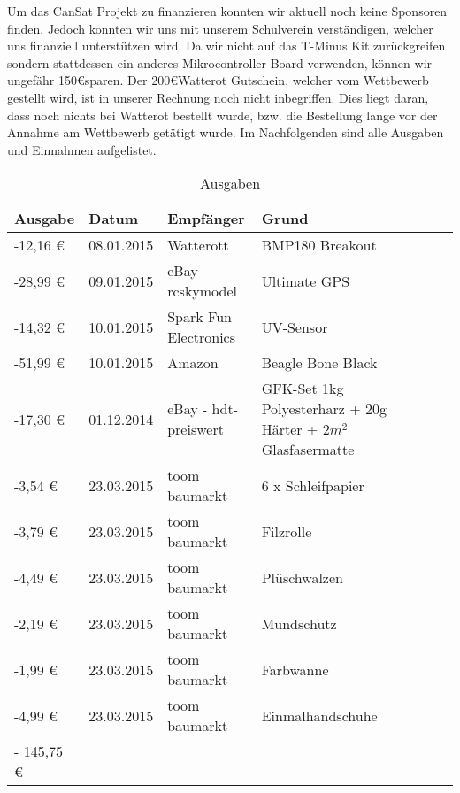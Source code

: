 Um das CanSat Projekt zu finanzieren konnten wir aktuell noch keine Sponsoren finden. Jedoch konnten wir uns mit unserem Schulverein verständigen, welcher uns finanziell unterstützen wird. Da wir nicht auf das T-Minus Kit zurückgreifen sondern stattdessen ein anderes Mikrocontroller Board verwenden, können wir ungefähr 150\euro  sparen. Der 200\euro  Watterot Gutschein, welcher vom Wettbewerb gestellt wird, ist in unserer Rechnung noch nicht inbegriffen. Dies liegt daran, dass noch nichts bei Watterot bestellt wurde, bzw. die Bestellung lange vor der Annahme am Wettbewerb getätigt wurde.
Im Nachfolgenden sind alle Ausgaben und Einnahmen aufgelistet.
\begin{table}[htbp]
  \centering
    \begin{tabular}{p{}p{}p{}p{}rrrl}
    \toprule
    \textbf{Ausgabe} & \textbf{Datum} & \textbf{Empfänger} & \textbf{Grund} \\
    \midrule
    -12,16 \euro  & 08.01.2015 & Watterott & BMP180 Breakout \\
    -28,99 \euro  & 09.01.2015 & eBay - rcskymodel & Ultimate GPS \\
    -14,32 \euro  & 10.01.2015 & Spark Fun Electronics & UV-Sensor \\
    -51,99 \euro  & 10.01.2015 & Amazon & Beagle Bone Black \\
    -17,30 \euro  & 01.12.2014 & eBay - hdt-preiswert & 
GFK-Set 1kg Polyesterharz + 20g Härter + $2m^2$ Glasfasermatte \\
    -3,54 \euro  & 23.03.2015 & toom baumarkt & 6 x Schleifpapier \\
    -3,79 \euro  & 23.03.2015 & toom baumarkt & Filzrolle \\
    -4,49 \euro  & 23.03.2015 & toom baumarkt & Plüschwalzen \\
    -2,19 \euro  & 23.03.2015 & toom baumarkt & Mundschutz \\
    -1,99 \euro  & 23.03.2015 & toom baumarkt & Farbwanne \\
    -4,99 \euro  & 23.03.2015 & toom baumarkt & Einmalhandschuhe \\
    \bottomrule
    - 145,75 \euro & & & \\
    \bottomrule
    \end{tabular}%
    \caption{Ausgaben}
  \label{tab:budgetausgaben}%
\end{table}%


